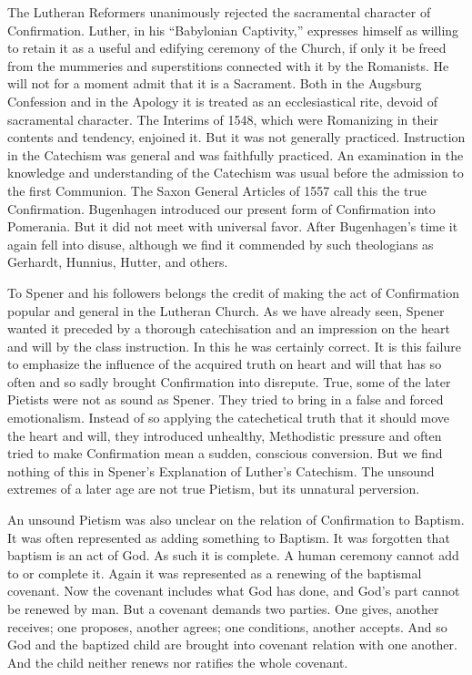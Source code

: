 The Lutheran Reformers unanimously rejected  the sacramental character of Confirmation. Luther, in his “Babylonian Captivity,” expresses himself as willing to retain it as a useful and edifying ceremony of the Church, if only it be freed from the mummeries and superstitions connected with it by the Romanists. He will not for a moment admit that it is a Sacrament. Both in the Augsburg Confession and in the Apology it is treated as an ecclesiastical rite, devoid of sacramental character. The Interims of 1548, which were Romanizing in their contents and tendency, enjoined it. But it was not generally practiced. Instruction in the Catechism was general and was faithfully practiced. An examination in the knowledge and understanding of the Catechism was usual before the admission to the first Communion. The Saxon General Articles of 1557 call this the true Confirmation.
Bugenhagen introduced our present form of Confirmation into Pomerania. But it did not meet with universal favor. After Bugenhagen’s time it again fell into disuse, although we find it commended by such theologians as Gerhardt, Hunnius, Hutter, and others.

To Spener and his followers belongs the credit of making the act of Confirmation popular and general in the Lutheran Church. As we have already seen, Spener wanted it preceded  by a thorough catechisation and an impression on the heart and will by the class instruction. In this he was certainly correct. It is this failure to emphasize the influence of the acquired truth on heart and will that has so often and so sadly brought Confirmation into disrepute. True, some of the later Pietists were not as sound as Spener. They tried to bring in a false and forced emotionalism. Instead of so applying the catechetical truth that it should move the heart and will, they introduced unhealthy, Methodistic pressure and often tried to make Confirmation mean a sudden, conscious conversion. But we find nothing of this in Spener’s Explanation of Luther’s Catechism. The unsound extremes of a later age are not true Pietism, but its unnatural perversion.

An unsound Pietism was also unclear on the relation of Confirmation to Baptism. It was often represented as adding something to Baptism.  It
was forgotten that baptism is an act of God. As such it is complete. A human ceremony cannot add to or complete it. Again it was represented as a renewing of the baptismal covenant. Now the covenant includes what God has done, and God’s part cannot be renewed by man. But a covenant demands two parties. One gives, another receives; one proposes, another agrees; one conditions, another accepts. And so God and the baptized child are brought into covenant relation with one another. And the child neither renews nor ratifies the whole covenant.

